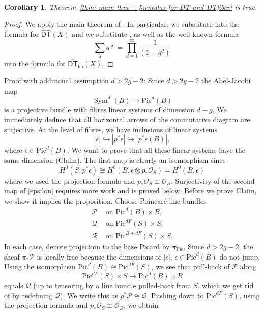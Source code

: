\documentclass{amsart}
\newtheorem{corollary}[theorem]{Corollary}
\theoremstyle{definition}
\renewcommand{\O}{\mathcal{O}}
\newcommand{\Pic}{\mathrm{Pic}}
\newcommand{\Sym}{\operatorname{Sym}}
\newcommand{\DT}{\mathsf{DT}}
\newcommand{\cP}{\mathcal{P}}
\newcommand{\cQ}{\mathcal{Q}}
\newcommand{\cR}{\mathcal{R}}
\newcommand{\DThat}{\widehat{\DT}}
\newcommand{\fiber}{\mathsf{fib}}
\begin{document}
\begin{corollary}
Theorem~\ref{thm: main thm -- formulas for DT and DTfiber} is true.
\end{corollary}
\begin{proof}
We apply the main theorem of \cite{Bryan-Kool-Young}. In particular, we substitute
\cite[Eqns~(2)\&(4)]{Bryan-Kool-Young} into the formula for $\DThat (X)$ and we substitute
\cite[Eqn~(1)]{Bryan-Kool-Young}, as well as the well-known formula
\[
\sum_{\lambda}q^{|\lambda |} =\prod_{d=1}^{\infty}\frac{1}{(1-q^{d})}
\]
into the formula for $\DThat_{\fiber } (X)$.
\end{proof}



Proof with additional assumption $d > 2g-2$:
Since $d > 2g-2$ the Abel-Jacobi map 
$$
\Sym^d(B) \rightarrow \Pic^d(B)
$$
is a projective bundle with fibres linear systems of dimension $d-g$. We immediately deduce that all horizontal arrows of the commutative diagram are surjective. At the level of fibres, we have inclusions of linear systems
\begin{equation} \label{epsilon}
|\epsilon| \hookrightarrow |p^* \epsilon| \hookrightarrow |p^* \epsilon (B)|,
\end{equation}
where $\epsilon \in \Pic^d(B)$. We want to prove that all these linear systems have the same dimension (Claim). The first map is clearly an isomorphism since
$$
H^0(S,p^* \epsilon) \cong H^0(B, \epsilon \otimes p_* \O_S) = H^0(B,\epsilon)
$$
where we used the projection formula and $p_* \O_S \cong \O_B$. Surjectivity of the second map of \eqref{epsilon} requires more work and is proved below. Before we prove Claim, we show it implies the proposition. Choose Poincar\'e line bundles 
\begin{align*}
\cP &\textrm{ \ on \ } \Pic^d(B) \times B, \\
\cQ &\textrm{ \ on \ } \Pic^{dF}(S) \times S, \\
\cR &\textrm{ \ on \ } \Pic^{B+dF}(S) \times S.
\end{align*}
In each case, denote projection to the base Picard by $\pi_{\Pic}$. Since $d > 2g-2$, the sheaf $\pi_* \mathcal{P}$ is locally free because the dimensions of $|\epsilon|$, $\epsilon \in \Pic^d(B)$ do not jump. Using the isomorphism $\Pic^d(B) \cong \Pic^{dF}(S)$, we see that pull-back of $\mathcal{P}$ along 
$$
\Pic^{dF}(S) \times S \rightarrow \Pic^d(B) \times B
$$
equals $\mathcal{Q}$ (up to tensoring by a line bundle pulled-back from $S$, which we get rid of by redefining $\mathcal{Q}$). We write this as $p^* \mathcal{P} \cong \mathcal{Q}$. Pushing down to $\Pic^{dF}(S)$, using the projection formula and $p_* \O_S \cong \O_B$, we obtain
\end{document}
